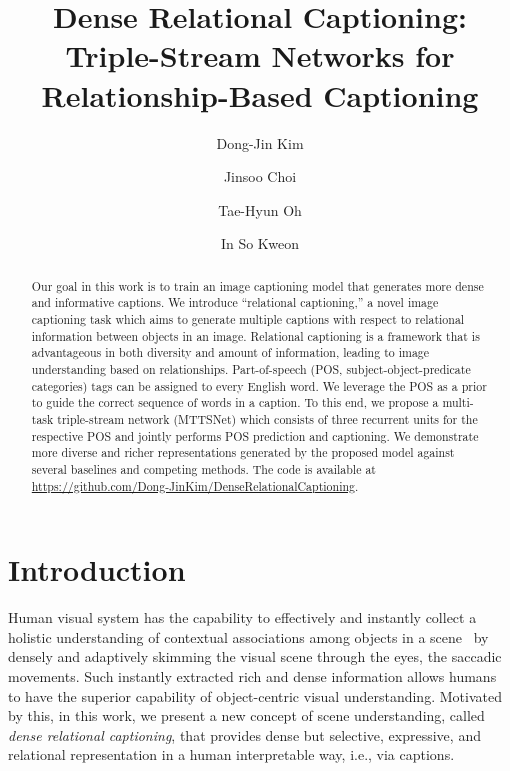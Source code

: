 \documentclass[10pt,twocolumn,letterpaper]{article}
\begin{document}
\title{Dense Relational Captioning: \\ Triple-Stream Networks for Relationship-Based Captioning\vspace{-8mm}}
\renewcommand\Authsep{\quad}
\renewcommand\Authand{\quad}
\renewcommand\Authands{\quad}
\makeatletter
\renewcommand\AB@affilsepx{ \protect\Affilfont}



\author[1]{Dong-Jin Kim}
\author[1]{Jinsoo Choi} 
\author[2]{Tae-Hyun Oh
} 
\author[1]{In So Kweon\vspace{-3mm}}


\maketitle
\thispagestyle{empty}

\begin{abstract}
Our goal in this work is to train an image captioning model that generates more dense and informative captions.
We introduce ``relational captioning,'' a novel {image captioning} task which aims to generate multiple captions with respect to relational information between objects in an image.
Relational captioning is a framework that is advantageous in both diversity and amount of information, leading to image understanding based on relationships.
{Part-of-speech} (POS, \ie subject-object-predicate categories) tags can be assigned to every English word.
We leverage the POS as a prior to guide the correct sequence of words in a caption.
To this end, we propose a multi-task triple-stream network (MTTSNet) which consists of three recurrent units for the respective POS and jointly performs POS prediction and captioning. 
We demonstrate more diverse and richer representations generated by the proposed model against several baselines and competing methods.
The code is available at \href{https://github.com/Dong-JinKim/DenseRelationalCaptioning}{https://github.com/Dong-JinKim/DenseRelationalCaptioning}.
\end{abstract}

\section{Introduction}
Human visual system has the capability to effectively and instantly collect a holistic understanding of contextual associations among objects in a scene~\cite{land2002organization,oliva2007role} by densely and adaptively skimming the visual scene through the eyes, \ie the saccadic movements.
Such instantly extracted rich and dense information allows humans to have the superior capability of object-centric visual understanding.
Motivated by this, in this work, we present a new concept of scene understanding, called \emph{dense relational captioning}, that provides dense but selective, expressive, and relational representation in a human interpretable way, i.e., via captions.
\end{document}
